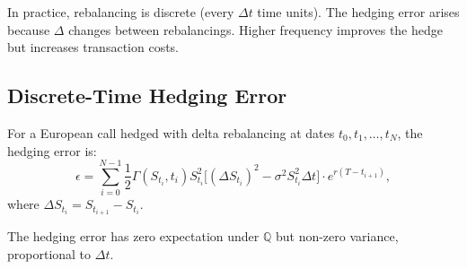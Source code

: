 \begin{intuition}[title=\textbf{Discrete-Time Hedging}]
In practice, rebalancing is discrete (every $\Delta t$ time units). The
hedging error arises because $\Delta$ changes between rebalancings. Higher
frequency improves the hedge but increases transaction costs.
\end{intuition}

\subsection{Discrete-Time Hedging Error}

\begin{proposition}
For a European call hedged with delta rebalancing at dates
$t_0, t_1, \ldots, t_N$, the hedging error is:
\[
    \epsilon = \sum_{i=0}^{N-1} \frac{1}{2}\Gamma(S_{t_i}, t_i)
    S_{t_i}^2\bigl[(\Delta S_{t_i})^2 - \sigma^2 S_{t_i}^2 \Delta t\bigr]
    \cdot e^{r(T-t_{i+1})},
\]
where $\Delta S_{t_i} = S_{t_{i+1}} - S_{t_i}$.
\end{proposition}

The hedging error has zero expectation under $\mathbb{Q}$ but non-zero
variance, proportional to $\Delta t$.


